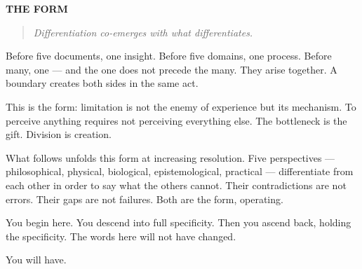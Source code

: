 \vspace{1cm}
\begin{center}
{\Large\sffamily\bfseries\color{headerblue} THE FORM}
\end{center}
\vspace{0.5cm}


\begin{quote}
\itshape
\textit{Differentiation co-emerges with what differentiates.}
\end{quote}


\bigskip\noindent\makebox[\textwidth]{\color{rulegray}\rule{5cm}{0.3pt}}\bigskip


Before five documents, one insight. Before five domains, one process. Before many, one — and the one does not precede the many. They arise together. A boundary creates both sides in the same act.


This is the form: limitation is not the enemy of experience but its mechanism. To perceive anything requires not perceiving everything else. The bottleneck is the gift. Division is creation.


What follows unfolds this form at increasing resolution. Five perspectives — philosophical, physical, biological, epistemological, practical — differentiate from each other in order to say what the others cannot. Their contradictions are not errors. Their gaps are not failures. Both are the form, operating.


You begin here. You descend into full specificity. Then you ascend back, holding the specificity. The words here will not have changed.


You will have.

